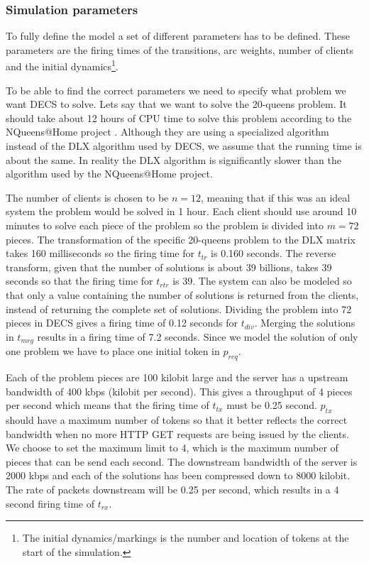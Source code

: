 \subsubsection{Simulation parameters}

To fully define the model a set of different parameters has to be defined.
These parameters are the firing times of the transitions, arc weights, number of clients and the initial dynamics\footnote{The initial dynamics/markings is the number and location of tokens at the start of the simulation.}.

To be able to find the correct parameters we need to specify what problem we want DECS to solve.
Lets say that we want to solve the 20-queens problem.
It should take about 12 hours of CPU time to solve this problem according to the NQueens@Home project \cite{nqueensathome}.
Although they are using a specialized algorithm instead of the DLX algorithm used by DECS, we assume that the running time is about the same.
In reality the DLX algorithm is significantly slower than the algorithm used by the NQueens@Home project.

The number of clients is chosen to be $n = 12$, meaning that if this was an ideal system the problem would be solved in 1 hour.
Each client should use around 10 minutes to solve each piece of the problem so the problem is divided into $m = 72$ pieces.
The transformation of the specific 20-queens problem to the DLX matrix takes 160 milliseconds so the firing time for $t_{tr}$ is 0.160 seconds.
The reverse transform, given that the number of solutions is about 39 billions, takes 39 seconds so that the firing time for $t_{rtr}$ is 39.
The system can also be modeled so that only a value containing the number of solutions is returned from the clients, instead of returning the complete set of solutions.
Dividing the problem into 72 pieces in DECS gives a firing time of 0.12 seconds for $t_{div}$.
Merging the solutions in $t_{mrg}$ results in a firing time of 7.2 seconds.
Since we model the solution of only one problem we have to place one initial token in $p_{req}$.

Each of the problem pieces are 100 kilobit large and the server has a upstream bandwidth of 400 kbps (kilobit per second).
This gives a throughput of 4 pieces per second which means that the firing time of $t_{tx}$ must be 0.25 second.
$p_{tx}$ should have a maximum number of tokens so that it better reflects the correct bandwidth when no more HTTP GET requests are being issued by the clients.
We choose to set the maximum limit to 4, which is the maximum number of pieces that can be send each second.
The downstream bandwidth of the server is 2000 kbps and each of the solutions has been compressed down to 8000 kilobit.
The rate of packets downstream will be 0.25 per second, which results in a 4 second firing time of $t_{rx}$.


